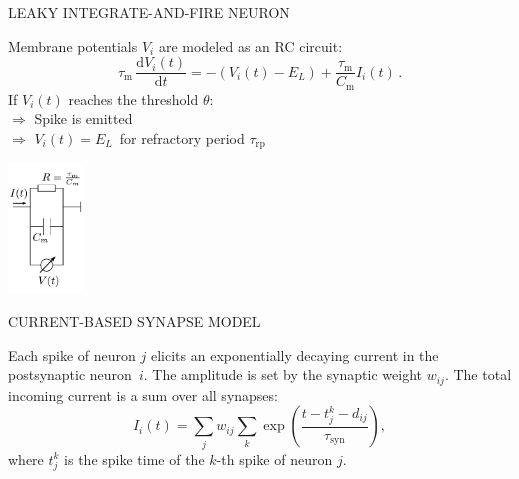 \documentclass[portrait, final, a0paper, fontscale=0.34, leqno]{baposter}
\begin{document}
\begin{poster}
{    \centerline{\uppercase{Leaky integrate-and-fire neuron}}
    \vspace{0.2cm}
    \begin{vwcol}[widths={0.75, 0.3},
            sep=.4cm, rule=0pt, indent=0em] 
    \setcounter{equation}{0}
    Membrane potentials $V_i$ are modeled as an RC circuit:
        \begin{equation}
            \tau_\text{m} \,\frac{\text{d} V_i(t)}{\text{d} t} 
            = - (V_i(t) - E_L) + \frac{\tau_\text{m}}{C_\text{m}} I_i(t) \,.
            \label{eq:lif-neuron}
        \end{equation}
        If $V_i(t)$ reaches the threshold $\theta$: \\
        \vspace{0.2cm}
            \quad $\Rightarrow$ 
                Spike is emitted \\
        \vspace{0.2cm}
            \quad $\Rightarrow$ 
                $V_i(t) = E_L$ \,for refractory period $\tau_\text{rp}$ 

    \includegraphics[width=2cm]{RC_circuit}

    \end{vwcol} 

    \vspace{0.5cm}
    \centerline{\uppercase{Current-based synapse model}}
    \vspace{0.3cm}
    Each spike of neuron $j$ elicits an exponentially decaying current in the
    postsynaptic neuron~$i$.  
    The amplitude is set by the synaptic weight $w_{ij}$. 
    The total incoming current is a sum over all synapses:
    \begin{equation}
        I_i(t) = 
            \sum_j w_{ij} \sum_k 
            \exp\left(\frac{t - t_j^k - d_{ij}}{\tau_\text{syn}}\right) ,
    \end{equation}
    where $t^k_j$ is the spike time of the $k$-th spike of neuron $j$.
}



\end{poster}
\end{document}
